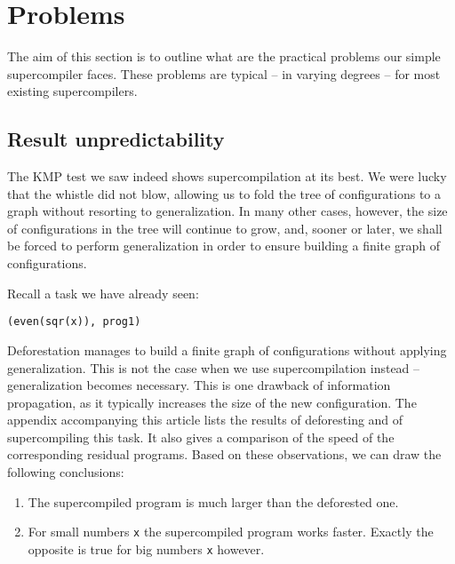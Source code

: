 \section{Problems}


The aim of this section is to outline what are the practical problems 
our simple supercompiler faces.
These problems are typical -- in varying degrees -- for most existing supercompilers.

\subsection{Result unpredictability}

The KMP test we saw indeed shows supercompilation at its best.
We were lucky that the whistle did not blow, allowing us to fold the tree of configurations
to a graph without resorting to generalization.
In many other cases, however, the size of configurations in the tree will
continue to grow, and, sooner or later, we shall be forced to 
perform generalization in order to ensure building a finite 
graph of configurations.

Recall a task we have already seen:
\begin{lstlisting}[language=sll]
(even(sqr(x)), prog1)
\end{lstlisting}

Deforestation manages to build a finite graph of configurations  without applying generalization.
This is not the case when we use supercompilation instead -- generalization becomes necessary.
This is one drawback of information propagation, as it typically
increases the size of the new configuration.
The appendix accompanying this article lists the results of deforesting and of supercompiling this task.
It also gives a comparison of the speed of the corresponding residual programs.
Based on these observations, we can draw the following conclusions:
\begin{enumerate}
  \item The supercompiled program is much larger than the deforested one.
  \item For small numbers \texttt{x} the supercompiled program works faster.
  Exactly the opposite is true for big numbers \texttt{x} however.
\end{enumerate}

